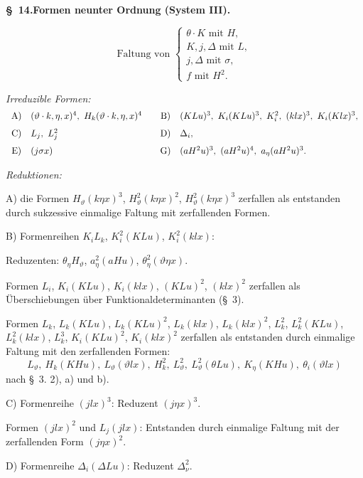\documentclass[11pt]{article}
\newcommand{\A}{\Delta}
\begin{document}
\begin{center}
\textbf{\S\ 14.\quad Formen neunter Ordnung (System III).}
\end{center}
\[
\text{Faltung von }\left\{\begin{array}{l}
\theta\cdot K\text{ mit }H,\\
K,j,\A\text{ mit }L,\\
j,\A\text{ mit }\sigma,\\
f\text{ mit }H^2.
\end{array}\right.
\]

\noindent\emph{Irreduzible Formen:}
\[
\begin{array}{c@{\quad}l@{\qquad}c@{\quad}l}
\text{A)}&(\vartheta\cdot k,\eta,x)^4,
\ H_k(\vartheta\cdot k,\eta,x)^4&
\text{B)}&(KLu)^3,
\ K_i(KLu)^3,
\ K_i^2,
\ (klx)^3,
\ K_i(Klx)^3,\\[0.7em]
\text{C)}&L_j,
\ L_j^2&
\text{D)}&\A_i,\\[0.7em]
\text{E)}&(j\sigma x)&
\text{G)}&(aH^2u)^3,
\ (aH^2u)^4,
\ a_\eta(aH^2u)^3.
\end{array}
\]

\noindent\emph{Reduktionen:}

A) die Formen $H_\vartheta(k\eta x)^3$, $H_\vartheta^2(k\eta x)^2$, $H_\vartheta^2(k\eta x)^3$ zerfallen als entstanden durch sukzessive einmalige Faltung mit zerfallenden Formen.

B) Formenreihen $K_iL_k$, $K_i^2(KLu)$, $K_i^2(klx)$:

Reduzenten: $\theta_\eta H_\vartheta$, $a_\eta^2(aHu)$, $\theta_\eta^2(\vartheta\eta x)$.

Formen $L_i$, $K_i(KLu)$, $K_i(klx)$, $(KLu)^2$, $(klx)^2$ zerfallen als Überschiebungen über Funktionaldeterminanten (\S\ 3).

Formen $L_k$, $L_k(KLu)$, $L_k(KLu)^2$, $L_k(klx)$, $L_k(klx)^2$, $L_k^2$, $L_k^2(KLu)$, $L_k^2(klx)$, $L_k^3$, $K_i(KLu)^2$, $K_i(klx)^2$ zerfallen als entstanden durch einmalige Faltung mit den zerfallenden Formen:
\[
L_\vartheta,
\ H_k(KHu),
\ L_\vartheta(\vartheta lx),
\ H_k^2,
\ L_\vartheta^2,
\ L_\vartheta^2(\theta Lu),
\ K_\eta(KHu),
\ \theta_i(\vartheta lx)
\]
nach \S\ 3. 2), a) und b).

C) Formenreihe $(jlx)^3$: Reduzent $(j\eta x)^3$.

Formen $(jlx)^2$ und $L_j(jlx)$: Entstanden durch einmalige Faltung mit der zerfallenden Form $(j\eta x)^2$.

D) Formenreihe $\A_i(\A Lu)$: Reduzent $\A_\nu^2$.
\end{document}
